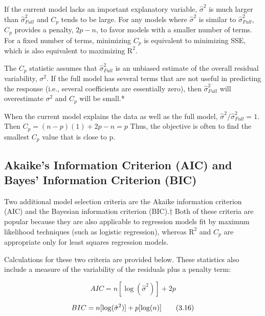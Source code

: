 \documentclass[
]{book}
\begin{document}
If the current model lacks an important explanatory variable, \(\hat{\sigma}^2\) is much larger than \(\hat{\sigma}^2_{Full}\) and \(C_p\) tends to be large. For any models where \(\hat{\sigma}^2\) is similar to \(\hat{\sigma}^2_{Full}\), \(C_p\) provides a penalty, \(2p - n\), to favor models with a smaller number of terms. For a fixed number of terms, minimizing \(C_p\) is equivalent to minimizing SSE, which is also equivalent to maximizing \(\mathrm{R}^2\).

The \(C_p\) statistic assumes that \(\hat{\sigma}^2_{Full}\) is an unbiased estimate of the overall residual variability, \(\sigma^2\). If the full model has several terms that are not useful in predicting the response (i.e., several coefficients are essentially zero), then \(\hat{\sigma}^2_{Full}\) will overestimate \(\sigma^2\) and \(C_p\) will be small.*

When the current model explains the data as well as the full model, \(\hat{\sigma}^2 / \hat{\sigma}^2_{Full} = 1\). Then \(C_p = (n - p)(1) + 2p - n = p\) Thus, the objective is often to find the smallest \(C_p\) value that is close to p.

\hypertarget{akaikes-information-criterion-aic-and-bayes-information-criterion-bic}{%
\subsection*{Akaike's Information Criterion (AIC) and Bayes' Information Criterion (BIC)}\label{akaikes-information-criterion-aic-and-bayes-information-criterion-bic}}

Two additional model selection criteria are the Akaike information criterion (AIC) and the Bayesian information criterion (BIC).† Both of these criteria are popular because they are also applicable to regression models fit by maximum likelihood techniques (such as logistic regression), whereas \(\mathrm{R}^2\) and \(C_p\) are appropriate only for least squares regression models.

Calculations for these two criteria are provided below. These statistics also include a measure of the variability of the residuals plus a penalty term:

\begin{equation}
AIC = n[\log(\hat{\sigma}^2)] + 2p 
\tag{3.15}
\end{equation}

\begin{equation}
BIC = n[\log(\hat{\sigma}^2)] + p[\log(n)] \notag
\tag{3.16}
\end{equation}
\end{document}
